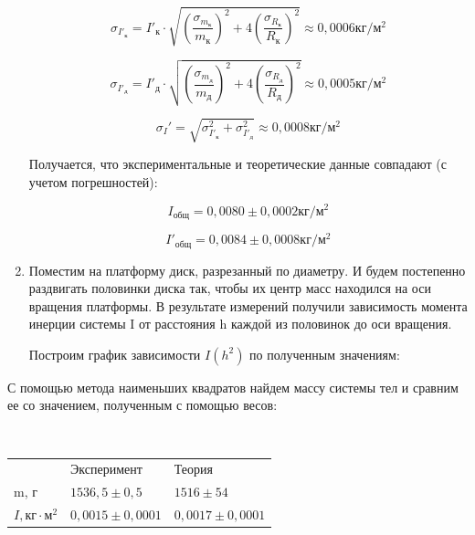 \documentclass[a4paper,12pt]{article} %
\begin{document}
\begin{enumerate}
\[ \sigma_{I'_к} = I'_к \cdot \sqrt{(\frac{\sigma_{m_к}}{m_к})^2+4(\frac{\sigma_{R_к}}{R_к})^2} \approx 0,0006 кг/м^2\]

\[ \sigma_{I'_{д}} = I'_{д}\cdot \sqrt{(\frac{\sigma_{m_д}}{m_д})^2+4(\frac{\sigma_{R_д}}{R_д})^2} \approx 0,0005 кг/м^2\]

\[\sigma_I' = \sqrt{\sigma_{I'_к}^2 + \sigma_{I'_д}^2}\approx 0,0008 кг/м^2\]

Получается, что экспериментальные и теоретические данные совпадают (с учетом погрешностей):

\[I_{общ} = 0,0080 \pm 0,0002 кг/м^2\]

\[I'_{общ} = 0,0084 \pm 0,0008 кг/м^2\]

\item Поместим на платформу диск, разрезанный по диаметру. И будем постепенно раздвигать половинки диска так, чтобы их центр масс находился на оси вращения платформы. В результате измерений получили зависимость момента инерции системы I от расстояния h каждой из половинок до оси вращения. 

Построим  график зависимости $I(h^2)$ по полученным значениям:

\end{enumerate}

\begin{figure}[h]
\label{fig:image}
\end{figure}

С помощью метода наименьших квадратов найдем массу системы тел и сравним ее со значением, полученным с помощью весов:

\

\begin{tabular}{lll}
                           & Эксперимент   & Теория        \\
m, г                       & $1536,5\pm0,5 $   & $1516\pm54$       \\
$I, кг\cdot м^2$ & $0,0015\pm0,0001$ & $0,0017\pm0,0001$
\end{tabular}
\end{document}
